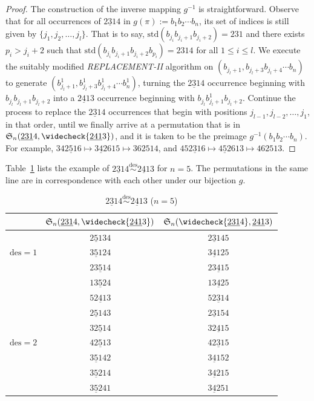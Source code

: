 \documentclass[11pt,reqno]{amsart}
\numberwithin{equation}{section}
\theoremstyle{plain}
\theoremstyle{definition}
\renewcommand{\S}{\mathfrak{S}}
\def\des{\mathrm{des}}
\def\std{\mathrm{std}}
\begin{document}
\begin{proof}
  The construction of the inverse mapping $g^{-1}$ is straightforward. Observe that for all occurrences of $\underline{231}4$ in $g(\pi):=b_1b_2\cdots b_n$, its set of indices is still given by $\{j_1,j_2,\ldots,j_l\}$. That is to say, $\std(b_{j_i}b_{j_i+1}b_{j_i+2})=231$ and there exists $p_i>j_i+2$
  such that $\std(b_{j_i}b_{j_i+1}b_{j_i+2}b_{p_i})=2314$ for all $1\le i \le l$.
  We execute the suitably modified \textit{REPLACEMENT-II} algorithm on $(b_{j_l+1},b_{j_l+3}b_{j_l+4}\cdots b_n)$ to generate $(b_{j_l+1}^1,b_{j_l+3}^1b_{j_l+4}^1\cdots b_n^1)$, turning the $\underline{231}4$ occurrence beginning with $b_{j_l}b_{j_l+1}b_{j_l+2}$ into a $\underline{241}3$ occurrence beginning with $b_{j_l}b_{j_l+1}^1b_{j_l+2}$. Continue the process to replace the $\underline{231}4$ occurrences that begin with positions $j_{l-1},j_{l-2},\ldots,j_1$, in that order, until we finally arrive at a permutation that is in $\S_n(\underline{231}4,\widecheck{\underline{241}3})$, and it is taken to be the preimage $g^{-1}(b_1b_2\cdots b_n)$. For example, $34\underline{251}6\mapsto  \underline{342}615 \mapsto 362514 $, and $45\underline{231}6 \mapsto  \underline{452}613 \mapsto 462513$.
\end{proof}

Table~\ref{tab:231-4--241-3} lists the example of $\underline{231}4\overset{\des}{\sim} \underline{241}3$ for $n=5$.
The permutations in the same line are in correspondence with each other under our bijection $g$.

\begin{table}[h]
\setlength{\tabcolsep}{15pt}
  \renewcommand{\arraystretch}{1.2}
  \centering
  \begin{tabular}{ccc} 
      &  $\S_n(\underline{231}4,\widecheck{\underline{241}3})$ & $\S_n(\widecheck{\underline{231}4},\underline{241}3)$ \\ \hline
     
       & $\underline{251}34$ & $\underline{231}45$  \\
   $\mathrm{des}=1$    & $\underline{351}24$ & $\underline{341}25$  \\
       & $2\underline{351}4$ & $2\underline{341}5$  \\
       & $1\underline{352}4$ & $1\underline{342}5$  \\\hline
   
       & $5\underline{241}3$ & $5\underline{231}4$   \\
       & $\underline{251}43$ &  $\underline{231}54$ \\
       &  $3\underline{251}4$ &  $3\underline{241}5$ \\
        $\mathrm{des}=2$ & $4\underline{251}3$ &  $4\underline{231}5$ \\
       & $\underline{351}42$ & $\underline{341}52$  \\
       & $\underline{352}14$ & $\underline{342}15$  \\
       & $\underline{352}41$ & $\underline{342}51$  \\      
       \hline
  \end{tabular}
  \caption{$\underline{231}4\overset{\des}{\sim} \underline{241}3$ ($n=5$)}
  \label{tab:231-4--241-3}
\end{table}
\end{document}
